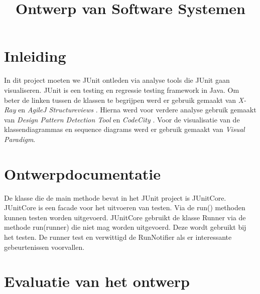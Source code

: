 \documentclass[a4paper, 11pt]{article}
\begin{document}
\begin{titlepage}
\title{Ontwerp van Software Systemen}
\author{}
\end{titlepage}



\maketitle
\newpage
\tableofcontents
\pagebreak

\section*{Inleiding}


In dit project moeten we JUnit ontleden via analyse tools die JUnit gaan visualiseren. JUnit is een testing en regressie testing framework in Java. Om beter de linken tussen de klassen te begrijpen werd er gebruik gemaakt van \textit{X-Ray} \cite{X-Ray} en \textit{AgileJ Structureviews} \cite{AgileJ Structureviews}. Hierna werd voor verdere analyse gebruik gemaakt van \textit{Design Pattern Detection Tool} \cite{Design Pattern Detection Tool} en \textit{CodeCity} \cite{CodeCity}. Voor de visualisatie van de klassendiagrammas en sequence diagrams werd er gebruik gemaakt van \textit{Visual Paradigm}.


\section{Ontwerpdocumentatie}

De klasse die de main methode bevat in het JUnit project is JUnitCore. JUnitCore is een facade voor het uitvoeren van testen. Via de run() methoden kunnen testen worden uitgevoerd. JUnitCore gebruikt de klasse Runner via de methode run(runner) die niet mag worden uitgevoerd. Deze wordt gebruikt bij het testen. De runner test en verwittigd de RunNotifier als er interessante gebeurtenissen voorvallen. 





\section{Evaluatie van het ontwerp}

\end{document}
